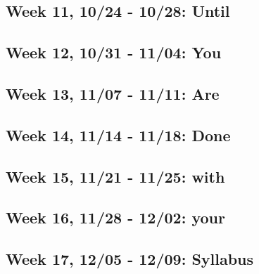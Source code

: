 \documentclass[11pt,]{article}
\begin{document}
\subsection{Week 11, 10/24 - 10/28:
Until}\label{week-11-1024---1028-until}

\subsection{Week 12, 10/31 - 11/04: You}\label{week-12-1031---1104-you}

\subsection{Week 13, 11/07 - 11/11: Are}\label{week-13-1107---1111-are}

\subsection{Week 14, 11/14 - 11/18:
Done}\label{week-14-1114---1118-done}

\subsection{Week 15, 11/21 - 11/25:
with}\label{week-15-1121---1125-with}

\subsection{Week 16, 11/28 - 12/02:
your}\label{week-16-1128---1202-your}

\subsection{Week 17, 12/05 - 12/09:
Syllabus}\label{week-17-1205---1209-syllabus}
\end{document}
